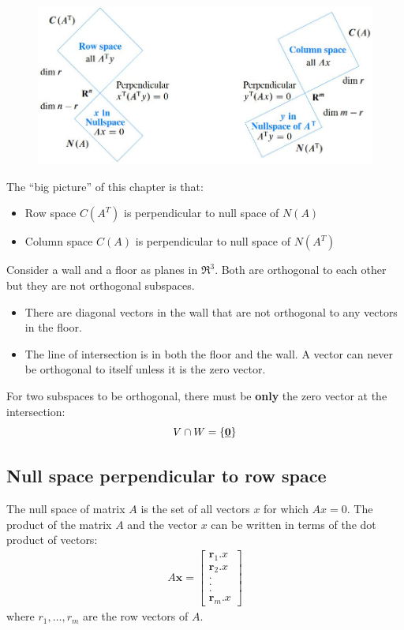 \documentclass[10pt,a4paper]{article}
\begin{document}
\begin{figure} [h!]
	\centering
	\includegraphics[scale=0.6]{Fundasub.JPG}
\end{figure}

The “big picture” of this chapter is that:
\begin{itemize}
    \item Row space $C(A^T)$ is perpendicular to null space of $N(A)$
    \item Column space $C(A)$ is perpendicular to null space of $N(A^T)$
\end{itemize}

Consider a wall and a floor as planes in $\Re^3$. Both are orthogonal to each other but they are not
orthogonal subspaces.
\begin{itemize}
    \item There are diagonal vectors in the wall that are not orthogonal to any vectors in the floor.
    \item The line of intersection is in both the floor and the wall. A vector can never be
    orthogonal to itself unless it is the zero vector.
\end{itemize}
\begin{tcolorbox}[breakable,colback=white]
	For two subspaces to be orthogonal, there must be \textbf{only} the zero vector at the intersection:
	$$ 
		V \cap W = \{\textbf{\underbar{0}}\} 
	$$
\end{tcolorbox}

\subsection{Null space perpendicular to row space}

The null space of matrix $A$ is the set of all vectors $x$ for which $Ax = 0$. The product of the
matrix $A$ and the vector $x$ can be written in terms of the dot product of vectors: 
\begin{align*}
	A \textbf{x} = 
	\begin{bmatrix}
		\textbf{r}_1.x \\
		\textbf{r}_2.x \\
		. \\
		. \\
		. \\
		\textbf{r}_m.x
	\end{bmatrix}
\end{align*}
where $r_1,\dots,r_m$ are the row vectors of $A$. 
\end{document}
